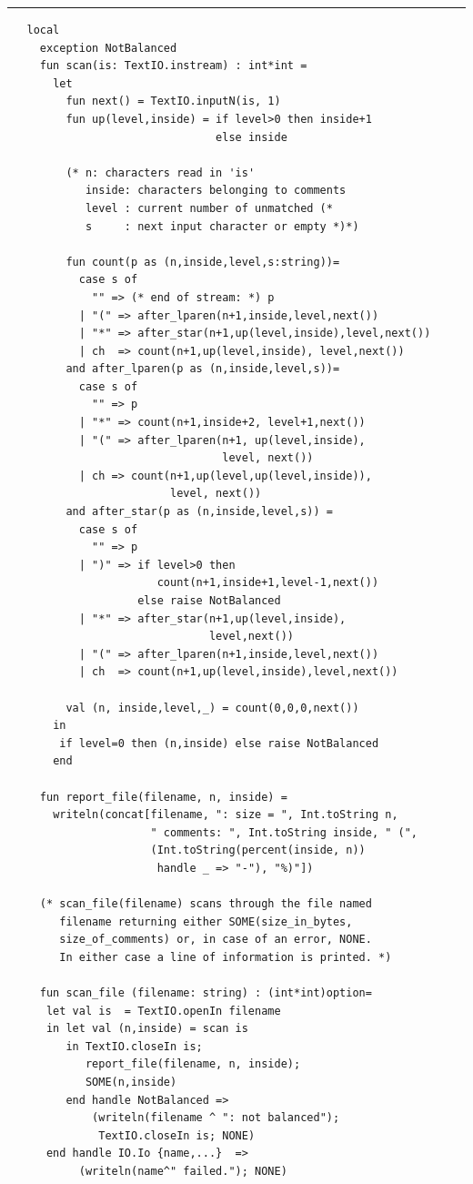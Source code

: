 \documentclass[12pt]{book}
\begin{document}
\bigskip
\hrule
\begin{verbatim}
   local
     exception NotBalanced
     fun scan(is: TextIO.instream) : int*int =
       let
         fun next() = TextIO.inputN(is, 1)
         fun up(level,inside) = if level>0 then inside+1 
                                else inside

         (* n: characters read in 'is'
            inside: characters belonging to comments
            level : current number of unmatched (* 
            s     : next input character or empty *)*)

         fun count(p as (n,inside,level,s:string))=
           case s of
             "" => (* end of stream: *) p
           | "(" => after_lparen(n+1,inside,level,next())
           | "*" => after_star(n+1,up(level,inside),level,next())
           | ch  => count(n+1,up(level,inside), level,next())
         and after_lparen(p as (n,inside,level,s))=
           case s of
             "" => p
           | "*" => count(n+1,inside+2, level+1,next())
           | "(" => after_lparen(n+1, up(level,inside), 
                                 level, next())
           | ch => count(n+1,up(level,up(level,inside)),
                         level, next())
         and after_star(p as (n,inside,level,s)) =
           case s of
             "" => p
           | ")" => if level>0 then
                       count(n+1,inside+1,level-1,next())
                    else raise NotBalanced
           | "*" => after_star(n+1,up(level,inside), 
                               level,next())
           | "(" => after_lparen(n+1,inside,level,next())
           | ch  => count(n+1,up(level,inside),level,next())

         val (n, inside,level,_) = count(0,0,0,next())
       in
        if level=0 then (n,inside) else raise NotBalanced
       end

     fun report_file(filename, n, inside) = 
       writeln(concat[filename, ": size = ", Int.toString n,
                      " comments: ", Int.toString inside, " (",
                      (Int.toString(percent(inside, n)) 
                       handle _ => "-"), "%)"])

     (* scan_file(filename) scans through the file named 
        filename returning either SOME(size_in_bytes, 
        size_of_comments) or, in case of an error, NONE. 
        In either case a line of information is printed. *)

     fun scan_file (filename: string) : (int*int)option=
      let val is  = TextIO.openIn filename 
      in let val (n,inside) = scan is
         in TextIO.closeIn is; 
            report_file(filename, n, inside);
            SOME(n,inside)
         end handle NotBalanced => 
             (writeln(filename ^ ": not balanced");
              TextIO.closeIn is; NONE)
      end handle IO.Io {name,...}  => 
           (writeln(name^" failed."); NONE)


\end{verbatim}
\end{document}
